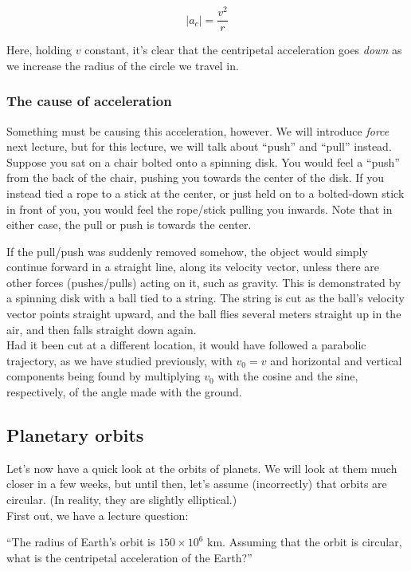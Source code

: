 \begin{equation}
|a_c| = \frac{v^2}{r}
\end{equation}

Here, holding $v$ constant, it's clear that the centripetal acceleration goes \emph{down} as we increase the radius of the circle we travel in.

\subsubsection{The cause of acceleration}

Something must be causing this acceleration, however. We will introduce \emph{force} next lecture, but for this lecture, we will talk about ``push'' and ``pull'' instead. Suppose you sat on a chair bolted onto a spinning disk. You would feel a ``push'' from the back of the chair, pushing you towards the center of the disk. If you instead tied a rope to a stick at the center, or just held on to a bolted-down stick in front of you, you would feel the rope/stick pulling you inwards. Note that in either case, the pull or push is towards the center.

If the pull/push was suddenly removed somehow, the object would simply continue forward in a straight line, along its velocity vector, unless there are other forces (pushes/pulls) acting on it, such as gravity. This is demonstrated by a spinning disk with a ball tied to a string. The string is cut as the ball's velocity vector points straight upward, and the ball flies several meters straight up in the air, and then falls straight down again.\\
Had it been cut at a different location, it would have followed a parabolic trajectory, as we have studied previously, with $v_0 = v$ and horizontal and vertical components being found by multiplying $v_0$ with the cosine and the sine, respectively, of the angle made with the ground.

\subsection{Planetary orbits}

Let's now have a quick look at the orbits of planets. We will look at them much closer in a few weeks, but until then, let's assume (incorrectly) that orbits are circular. (In reality, they are slightly elliptical.)\\
First out, we have a lecture question:

``The radius of Earth's orbit is $150 \times 10^6$ km. Assuming that the orbit is circular, what is the centripetal acceleration of the Earth?''

